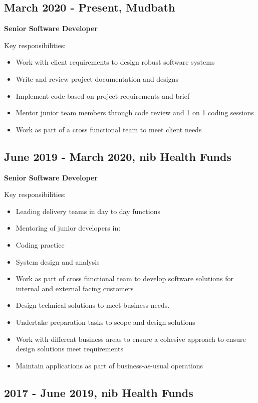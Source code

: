 \documentclass[11pt]{article}
\begin{document}
\subsection*{March 2020 - Present, Mudbath}
\label{sec:orgf9533dc}

\textbf{Senior Software Developer}

Key responsibilities:

\begin{itemize}
\item Work with client requirements to design robust software systems
\item Write and review project documentation and designs
\item Implement code based on project requirements and brief
\item Mentor junior team members through code review and 1 on 1 coding sessions
\item Work as part of a cross functional team to meet client needs
\end{itemize}
\subsection*{June 2019 - March 2020, nib Health Funds}
\label{sec:org3932361}

\textbf{Senior Software Developer}

Key responsibilities:

\begin{itemize}
\item Leading delivery teams in day to day functions
\item Mentoring of junior developers in:
\item Coding practice
\item System design and analysis
\item Work as part of cross functional team to develop software solutions for internal and external facing customers
\item Design technical solutions to meet business needs.
\item Undertake preparation tasks to scope and design solutions
\item Work with different business areas to ensure a cohesive approach to ensure design solutions meet requirements
\item Maintain applications as part of business-as-usual operations
\end{itemize}
\subsection*{2017 - June 2019, nib Health Funds}
\label{sec:org8da18d5}
\end{document}
